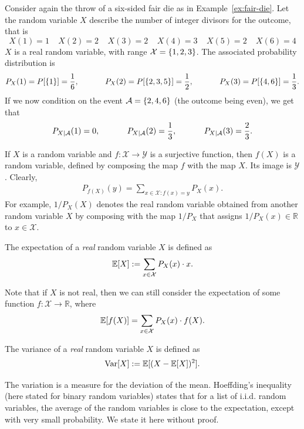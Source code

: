 \begin{example}
Consider again the throw of a six-sided fair die as in Example~\ref{ex:fair-die}. Let the random variable $X$ describe the number of integer divisors for the outcome, that is
\[X(1) = 1 \ \ \ \ \ X(2) = 2 \ \ \ \ \ X(3) = 2 \ \ \ \ \ X(4) = 3 \ \ \ \ \ X(5) = 2 \ \ \ \ \ X(6) = 4
\]
$X$ is a real random variable, with range $\mathcal{X} = \{1,2,3\}$. The associated probability distribution is
\[P_X(1) = P[\{1\}] = \frac{1}{6}, \ \ \ \ \ \ \ \ \ \ P_X(2) = P[\{2,3,5\}] = \frac{1}{2}, \ \ \ \ \ \ \ \ \ \ P_X(3) = P[\{4,6\}] = \frac{1}{3}.
\]
If we now condition on the event $\mathcal{A} = \{2,4,6\}$ (the outcome being even), we get that
\[P_{X | \evA}(1) = 0, \ \ \ \ \ \ \ \ \ \ P_{X | \evA}(2) = \frac{1}{3}, \ \ \ \ \ \ \ \ \ \ P_{X | \evA}(3) = \frac{2}{3}.
\]
\end{example}
If $X$ is a random variable and $f : \mathcal{X} \to \mathcal{Y}$ is a surjective function, then $f(X)$ is a random variable, defined by composing the map $f$ with the map $X$. Its image is $\mathcal{Y}$. Clearly,
\begin{align}
P_{f(X)}(y) = \sum_{x \in \mathcal{X} : f(x) = y} P_X(x).
\end{align}
For example, $1/P_X(X)$ denotes the real random variable obtained from another random variable $X$ by composing with the map $1/P_X$ that assigns $1/P_X(x) \in \mathbb{R}$ to $x \in \mathcal{X}$.

\begin{definition}[Expectation]
The expectation of a \emph{real} random variable $X$ is defined as
\[
\mathbb{E}[X] := \sum_{x \in \mathcal{X}} P_X(x) \cdot x.
\]
\end{definition}
Note that if $X$ is not real, then we can still consider the expectation of some function $f : \mathcal{X} \to \mathbb{R}$, where
\begin{align}
\mathbb{E}[f(X)] = \sum_{x \in \mathcal{X}} P_X(x) \cdot f(X).
\end{align}
\begin{definition}[Variance]
The variance of a \emph{real} random variable $X$ is defined as
\[
\mathrm{Var}[X] := \mathbb{E}[(X - \mathbb{E}[X])^2].
\]
\end{definition}
The variation is a measure for the deviation of the mean. Hoeffding's inequality (here stated for binary random variables) states that for a list of i.i.d. random variables, the average of the random variables is close to the expectation, except with very small probability. We state it here without proof.

